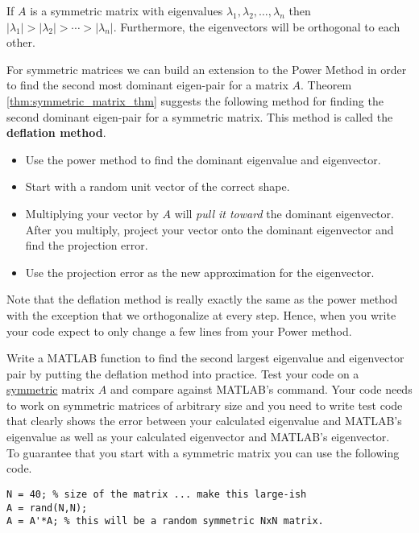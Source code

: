 \begin{thm}\label{thm:symmetric_matrix_thm}
    If $A$ is a symmetric matrix with eigenvalues $\lambda_1, \lambda_2, \ldots,
    \lambda_n$ then $|\lambda_1| > |\lambda_2| > \cdots > |\lambda_n|$.  Furthermore, the
    eigenvectors will be orthogonal to each other. 
\end{thm}


\begin{problem}
    For symmetric matrices we can build an extension to the Power Method in order
    to find the second most dominant eigen-pair for a matrix $A$.  Theorem
    \ref{thm:symmetric_matrix_thm} suggests the following method for finding the second
    dominant eigen-pair for a symmetric matrix.  This method is called the {\bf deflation
    method}.
    \begin{itemize}
        \item Use the power method to find the dominant eigenvalue and eigenvector.
        \item Start with a random unit vector of the correct shape.
        \item Multiplying your vector by $A$ will {\it pull it toward} the dominant
            eigenvector.  After you multiply, project your vector onto the dominant
            eigenvector and find the projection error.  
        \item Use the projection error as the new approximation for the eigenvector.
    \end{itemize}    

    Note that the deflation method is really exactly the same as the power method with the
    exception that we orthogonalize at every step.  Hence, when you write your code expect
    to only change a few lines from your Power method.

    Write a
    MATLAB function  to find the second largest eigenvalue and
    eigenvector pair by putting the deflation method into practice. Test your code on a
    \underline{symmetric} matrix $A$ and compare against MATLAB's  command.
    Your code needs to work on symmetric matrices of arbitrary size and you need to write
    test code that clearly shows the error between your calculated eigenvalue and MATLAB's
    eigenvalue as well as your calculated eigenvector and MATLAB's eigenvector.\\ To
    guarantee that you start with a symmetric matrix you can use the following code.
\begin{lstlisting}
N = 40; % size of the matrix ... make this large-ish
A = rand(N,N);
A = A'*A; % this will be a random symmetric NxN matrix.
\end{lstlisting}
\end{problem}



